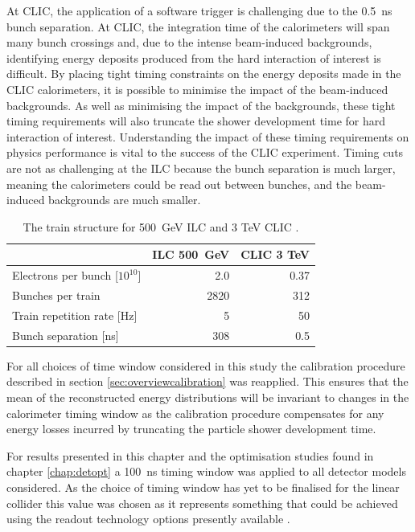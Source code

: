 At CLIC, the application of a software trigger is challenging due to the 0.5~ns bunch separation.  At CLIC, the integration time of the calorimeters will span many bunch crossings and, due to the intense beam-induced backgrounds, identifying energy deposits produced from the hard interaction of interest is difficult.  By placing tight timing constraints on the energy deposits made in the CLIC calorimeters, it is possible to minimise the impact of the beam-induced backgrounds.  As well as minimising the impact of the backgrounds, these tight timing requirements will also truncate the shower development time for hard interaction of interest.  Understanding the impact of these timing requirements on physics performance is vital to the success of the CLIC experiment.  Timing cuts are not as challenging at the ILC because the bunch separation is much larger, meaning the calorimeters could be read out between bunches, and the beam-induced backgrounds are much smaller.  

\begin{table}[h!]
\centering
\begin{tabular}{l r r}
\hline
& ILC 500~GeV & CLIC 3 TeV \\
\hline
Electrons per bunch [$10^{10}$] & 2.0 & 0.37 \\
Bunches per train & 2820 & 312 \\
Train repetition rate [Hz] & 5 & 50 \\
Bunch separation [ns] & 308 & 0.5 \\
\end{tabular}
\caption[The train structure for 500~GeV ILC and 3 TeV CLIC \cite{Behnke:2013lya,Linssen:2012hp}.]{The train structure for 500~GeV ILC and 3 TeV CLIC \cite{Behnke:2013lya,Linssen:2012hp}.}
\label{table:trainstructure}
\end{table}

For all choices of time window considered in this study the calibration procedure described in section \ref{sec:overviewcalibration} was reapplied.  This ensures that the mean of the reconstructed energy distributions will be invariant to changes in the calorimeter timing window as the calibration procedure compensates for any energy losses incurred by truncating the particle shower development time.  

For results presented in this chapter and the optimisation studies found in chapter \ref{chap:detopt} a 100~ns timing window was applied to all detector models considered.  As the choice of timing window has yet to be finalised for the linear collider this value was chosen as it represents something that could be achieved using the readout technology options presently available \cite{Adloff:2014rya}.  

